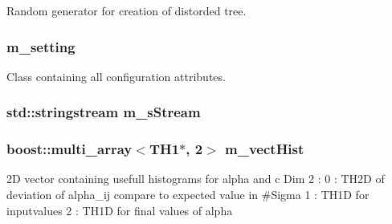 Random generator for creation of distorded tree. 

\hypertarget{classTemplateMethod_1_1Template_aa845b6e4b07ce986dfc6194a042f3547}{
\subsubsection[{m\+\_\+setting}]{ m\+\_\+setting\hspace{0.3cm}{\ttfamily [private]}}}\label{classTemplateMethod_1_1Template_aa845b6e4b07ce986dfc6194a042f3547}


Class containing all configuration attributes. 

\hypertarget{classTemplateMethod_1_1Template_a933478f89782a5046a2e440d087029fa}{
\subsubsection[{m\+\_\+s\+Stream}]{\setlength{\rightskip}{0pt plus 5cm}std\+::stringstream m\+\_\+s\+Stream\hspace{0.3cm}{\ttfamily [private]}}}\label{classTemplateMethod_1_1Template_a933478f89782a5046a2e440d087029fa}
\hypertarget{classTemplateMethod_1_1Template_a9a70b763c4c2f3c4c67bb29bc0aedc01}{
\subsubsection[{m\+\_\+vect\+Hist}]{\setlength{\rightskip}{0pt plus 5cm}boost\+::multi\+\_\+array$<$T\+H1$\ast$, 2$>$ m\+\_\+vect\+Hist\hspace{0.3cm}{\ttfamily [private]}}}\label{classTemplateMethod_1_1Template_a9a70b763c4c2f3c4c67bb29bc0aedc01}


2\+D vector containing usefull histograms for alpha and c Dim 2 \+: 0 \+: T\+H2\+D of deviation of alpha\+\_\+ij compare to expected value in \#\+Sigma 1 \+: T\+H1\+D for inputvalues 2 \+: T\+H1\+D for final values of alpha 

